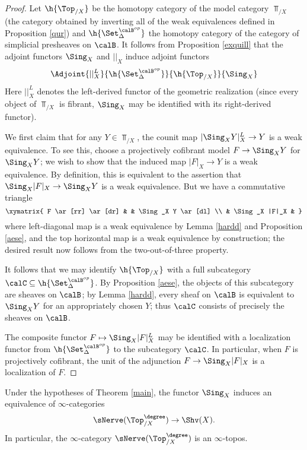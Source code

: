 \begin{proof}
Let $\h{\Top_{/X}}$ be the homotopy category of the model category $\Top_{/X}$ (the category obtained by inverting all of the weak equivalences defined in Proposition \ref{qur}) and
$\h{\Set_{\Delta}^{\calB^{op}}}$ the homotopy category of the category of simplicial presheaves on $\calB$. It follows from Proposition \ref{exquill} that 
the adjoint functors $\Sing_X$ and $||_X$ induce adjoint functors
$$ \Adjoint{||_X^L}{\h{\Set_{\Delta}^{\calB^{op}}}}{\h{\Top_{/X}}}{\Sing_{X}}$$
Here $||^{L}_{X}$ denotes the left-derived functor of the geometric realization (since
every object of $\Top_{/X}$ is fibrant, $\Sing_X$ may be identified with its right-derived functor).

We first claim that for any $Y \in \Top_{/X}$, the counit map
$ | \Sing_X Y |_{X}^{L} \rightarrow Y$ is a weak equivalence. To see this, choose a projectively cofibrant model $F \rightarrow \Sing_X Y$ for $\Sing_X Y$; we wish to show that
the induced map $|F|_{X} \rightarrow Y$ is a weak equivalence. By definition, this is
equivalent to the assertion that $\Sing_X |F|_{X} \rightarrow \Sing_X Y$ is a weak equivalence. But we have a commutative triangle
$$ \xymatrix{ F \ar[rr] \ar[dr] & & \Sing_X Y \ar[dl] \\
& \Sing_X |F|_X & }$$
where left-diagonal map is a weak equivalence by Lemma \ref{hardd} and Proposition \ref{aese}, and the top horizontal map is a weak equivalence by construction; the desired result now follows from the two-out-of-three property.

It follows that we may identify $\h{\Top_{/X}}$ with a full subcategory $\calC \subseteq \h{\Set_{\Delta}^{\calB^{op}}}$. By Proposition \ref{aese}, the objects of this subcategory are sheaves on $\calB$; by Lemma \ref{hardd}, every sheaf on $\calB$ is equivalent to $\Sing_X Y$ for an appropriately chosen $Y$; thus $\calC$ consists of precisely the sheaves on $\calB$.

The composite functor $F \mapsto \Sing_{X} |F|^{L}_{X}$ may be identified with a localization
functor from $\h{\Set_{\Delta}^{\calB^{op}}}$ to the subcategory $\calC$. In particular, when $F$ is projectively cofibrant, the unit of the adjunction $F \rightarrow \Sing_{X} |F|_{X}$ is a localization of $F$.
\end{proof}

\begin{corollary}\label{wamain}
Under the hypotheses of Theorem \ref{main}, the functor $\Sing_{X}$ induces an equivalence of $\infty$-categories
$$ \sNerve( \Top_{/X}^{\degree} ) \rightarrow \Shv(X).$$
In particular, the $\infty$-category $\sNerve ( \Top_{/X}^{\degree} )$ is an $\infty$-topos.
\end{corollary}


